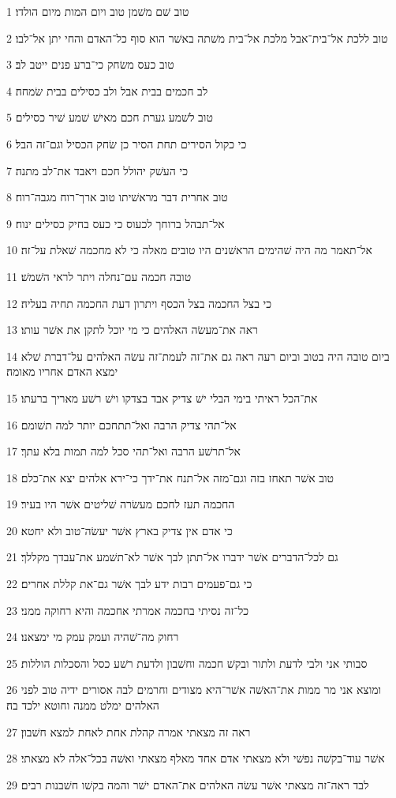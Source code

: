 \par 1 טוב שׁם משׁמן טוב ויום המות מיום הולדו׃
\par 2 טוב ללכת אל־בית־אבל מלכת אל־בית משׁתה באשׁר הוא סוף כל־האדם והחי יתן אל־לבו׃
\par 3 טוב כעס משׂחק כי־ברע פנים ייטב לב׃
\par 4 לב חכמים בבית אבל ולב כסילים בבית שׂמחה׃
\par 5 טוב לשׁמע גערת חכם מאישׁ שׁמע שׁיר כסילים׃
\par 6 כי כקול הסירים תחת הסיר כן שׂחק הכסיל וגם־זה הבל׃
\par 7 כי העשׁק יהולל חכם ויאבד את־לב מתנה׃
\par 8 טוב אחרית דבר מראשׁיתו טוב ארך־רוח מגבה־רוח׃
\par 9 אל־תבהל ברוחך לכעוס כי כעס בחיק כסילים ינוח׃
\par 10 אל־תאמר מה היה שׁהימים הראשׁנים היו טובים מאלה כי לא מחכמה שׁאלת על־זה׃
\par 11 טובה חכמה עם־נחלה ויתר לראי השׁמשׁ׃
\par 12 כי בצל החכמה בצל הכסף ויתרון דעת החכמה תחיה בעליה׃
\par 13 ראה את־מעשׂה האלהים כי מי יוכל לתקן את אשׁר עותו׃
\par 14 ביום טובה היה בטוב וביום רעה ראה גם את־זה לעמת־זה עשׂה האלהים על־דברת שׁלא ימצא האדם אחריו מאומה׃
\par 15 את־הכל ראיתי בימי הבלי ישׁ צדיק אבד בצדקו וישׁ רשׁע מאריך ברעתו׃
\par 16 אל־תהי צדיק הרבה ואל־תתחכם יותר למה תשׁומם׃
\par 17 אל־תרשׁע הרבה ואל־תהי סכל למה תמות בלא עתך׃
\par 18 טוב אשׁר תאחז בזה וגם־מזה אל־תנח את־ידך כי־ירא אלהים יצא את־כלם׃
\par 19 החכמה תעז לחכם מעשׂרה שׁליטים אשׁר היו בעיר׃
\par 20 כי אדם אין צדיק בארץ אשׁר יעשׂה־טוב ולא יחטא׃
\par 21 גם לכל־הדברים אשׁר ידברו אל־תתן לבך אשׁר לא־תשׁמע את־עבדך מקללך׃
\par 22 כי גם־פעמים רבות ידע לבך אשׁר גם־את קללת אחרים׃
\par 23 כל־זה נסיתי בחכמה אמרתי אחכמה והיא רחוקה ממני׃
\par 24 רחוק מה־שׁהיה ועמק עמק מי ימצאנו׃
\par 25 סבותי אני ולבי לדעת ולתור ובקשׁ חכמה וחשׁבון ולדעת רשׁע כסל והסכלות הוללות׃
\par 26 ומוצא אני מר ממות את־האשׁה אשׁר־היא מצודים וחרמים לבה אסורים ידיה טוב לפני האלהים ימלט ממנה וחוטא ילכד בה׃
\par 27 ראה זה מצאתי אמרה קהלת אחת לאחת למצא חשׁבון׃
\par 28 אשׁר עוד־בקשׁה נפשׁי ולא מצאתי אדם אחד מאלף מצאתי ואשׁה בכל־אלה לא מצאתי׃
\par 29 לבד ראה־זה מצאתי אשׁר עשׂה האלהים את־האדם ישׁר והמה בקשׁו חשׁבנות רבים׃

